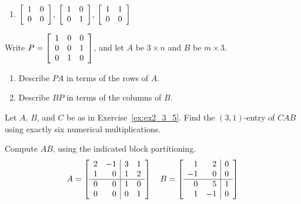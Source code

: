 \begin{multicols}{2}
\begin{ex}
\begin{sol}
\begin{enumerate}[label={\alph*.}]
\begin{enumerate}[label={\roman*.}]
\item
$
\left[ \begin{array}{rr}
1 & 0 \\
0 & 0
\end{array} \right]$, $\left[ \begin{array}{rr}
1 & 0 \\
0 & 1
\end{array} \right]$, $\left[ \begin{array}{rr}
1 & 1 \\
0 & 0
\end{array} \right]
$
\end{enumerate}

\end{enumerate}
\end{sol}
\end{ex}

\begin{ex}
Write $P = \left[ \begin{array}{rrr}
1 & 0 & 0 \\
0 & 0 & 1 \\
0 & 1 & 0
\end{array} \right]$, and let $A$ be $3 \times n$ and $B$ be $m \times 3$.


\begin{enumerate}[label={\alph*.}]
\item Describe $PA$ in terms of the rows of $A$.

\item Describe $BP$ in terms of the columns of $B$.

\end{enumerate}
\end{ex}

\begin{ex}
Let $A$, $B$, and $C$ be as in Exercise~\ref{ex:ex2_3_5}. Find the $(3, 1)$-entry of $CAB$ using exactly six numerical multiplications.
\end{ex}

\begin{ex}
Compute $AB$, using the indicated block partitioning.
\begin{equation*}
A = \left[ \begin{array}{rr|rr}
2 & -1 & 3 & 1 \\
1 & 0  & 1 & 2 \\
\hline
0 & 0 & 1 & 0 \\
0 & 0 & 0 & 1
\end{array} \right] \quad
B = \left[ \begin{array}{rr|r}
1 & 2 & 0 \\
-1 & 0  & 0 \\
\hline
0 & 5 & 1 \\
1 & -1 & 0 
\end{array} \right]
\end{equation*}
\end{ex}


\end{multicols}
